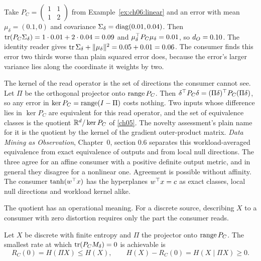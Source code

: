 \begin{example}\label{ex:ch06:bias}
Take $P_C=\begin{pmatrix}1&1\\1&2\end{pmatrix}$ from Example~\ref{ex:ch06:linear} and an error with mean $\mu_\delta=(0.1,0)$ and covariance $\Sigma_\delta=\operatorname{diag}(0.01,0.04)$. Then $\operatorname{tr}(P_C\Sigma_\delta)=1\cdot0.01+2\cdot0.04=0.09$ and $\mu_\delta^{\top} P_C\mu_\delta=0.01$, so $d_O=0.10$. The identity reader gives $\operatorname{tr}\Sigma_\delta+\lVert \mu_\delta\rVert^2=0.05+0.01=0.06$. The consumer finds this error two thirds worse than plain squared error does, because the error's larger variance lies along the coordinate it weights by two.
\end{example}

The kernel of the read operator is the set of directions the consumer cannot see. Let $\Pi$ be the orthogonal projector onto $\operatorname{range} P_C$. Then $\delta^{\top} P_C\delta=(\Pi\delta)^{\top} P_C(\Pi\delta)$, so any error in $\operatorname{ker} P_C=\operatorname{range}(I-\Pi)$ costs nothing. Two inputs whose difference lies in $\ker P_C$ are equivalent for this read operator, and the set of equivalence classes is the quotient $\mathbb{R}^d/\operatorname{ker} P_C$ of \cref{ch05}. The novelty assessment's plain name for it is the quotient by the kernel of the gradient outer-product matrix. \emph{Data Mining as Observation}, Chapter~0, section 0.6 separates this workload-averaged equivalence from exact equivalence of outputs and from local null directions. The three agree for an affine consumer with a positive definite output metric, and in general they disagree for a nonlinear one. Agreement is possible without affinity. The consumer $\tanh(w^{\top} x)$ has the hyperplanes $w^{\top} x=c$ as exact classes, local null directions and workload kernel alike.

The quotient has an operational meaning. For a discrete source, describing $X$ to a consumer with zero distortion requires only the part the consumer reads.

\begin{proposition}\label{prop:ch06:floor}
Let $X$ be discrete with finite entropy and $\Pi$ the projector onto $\operatorname{range} P_C$. The smallest rate at which $\operatorname{tr}(P_C M_\delta)=0$ is achievable is
\begin{equation}\label{eq:ch06:floor}
R_C(0)=H(\Pi X)\le H(X),\qquad H(X)-R_C(0)=H(X\mid \Pi X)\ge 0 .
\end{equation}
\end{proposition}

